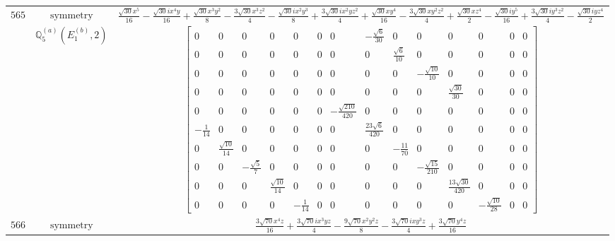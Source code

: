 \documentclass[fleqn,8pt,landscape]{jsarticle}
\begin{document}
\begin{longtable}{ccc}
$ 565 $ & $ \text{symmetry} $ & $ \frac{\sqrt{30} x^{5}}{16} - \frac{\sqrt{30} i x^{4} y}{16} + \frac{\sqrt{30} x^{3} y^{2}}{8} - \frac{3 \sqrt{30} x^{3} z^{2}}{4} - \frac{\sqrt{30} i x^{2} y^{3}}{8} + \frac{3 \sqrt{30} i x^{2} y z^{2}}{4} + \frac{\sqrt{30} x y^{4}}{16} - \frac{3 \sqrt{30} x y^{2} z^{2}}{4} + \frac{\sqrt{30} x z^{4}}{2} - \frac{\sqrt{30} i y^{5}}{16} + \frac{3 \sqrt{30} i y^{3} z^{2}}{4} - \frac{\sqrt{30} i y z^{4}}{2} $ \\
$  $ & $ \mathbb{Q}_{5}^{(a)}(E_{1}^{(b)},2) $ & $ \begin{bmatrix} 0 & 0 & 0 & 0 & 0 & 0 & 0 & - \frac{\sqrt{6}}{30} & 0 & 0 & 0 & 0 & 0 & 0 \\ 0 & 0 & 0 & 0 & 0 & 0 & 0 & 0 & \frac{\sqrt{6}}{10} & 0 & 0 & 0 & 0 & 0 \\ 0 & 0 & 0 & 0 & 0 & 0 & 0 & 0 & 0 & - \frac{\sqrt{10}}{10} & 0 & 0 & 0 & 0 \\ 0 & 0 & 0 & 0 & 0 & 0 & 0 & 0 & 0 & 0 & \frac{\sqrt{30}}{30} & 0 & 0 & 0 \\ 0 & 0 & 0 & 0 & 0 & 0 & - \frac{\sqrt{210}}{420} & 0 & 0 & 0 & 0 & 0 & 0 & 0 \\ - \frac{1}{14} & 0 & 0 & 0 & 0 & 0 & 0 & \frac{23 \sqrt{6}}{420} & 0 & 0 & 0 & 0 & 0 & 0 \\ 0 & \frac{\sqrt{10}}{14} & 0 & 0 & 0 & 0 & 0 & 0 & - \frac{11}{70} & 0 & 0 & 0 & 0 & 0 \\ 0 & 0 & - \frac{\sqrt{5}}{7} & 0 & 0 & 0 & 0 & 0 & 0 & - \frac{\sqrt{15}}{210} & 0 & 0 & 0 & 0 \\ 0 & 0 & 0 & \frac{\sqrt{10}}{14} & 0 & 0 & 0 & 0 & 0 & 0 & \frac{13 \sqrt{30}}{420} & 0 & 0 & 0 \\ 0 & 0 & 0 & 0 & - \frac{1}{14} & 0 & 0 & 0 & 0 & 0 & 0 & - \frac{\sqrt{10}}{28} & 0 & 0 \end{bmatrix} $ \\ \hline
$ 566 $ & $ \text{symmetry} $ & $ \frac{3 \sqrt{70} x^{4} z}{16} + \frac{3 \sqrt{70} i x^{3} y z}{4} - \frac{9 \sqrt{70} x^{2} y^{2} z}{8} - \frac{3 \sqrt{70} i x y^{3} z}{4} + \frac{3 \sqrt{70} y^{4} z}{16} $ \\

\end{longtable}
\end{document}

